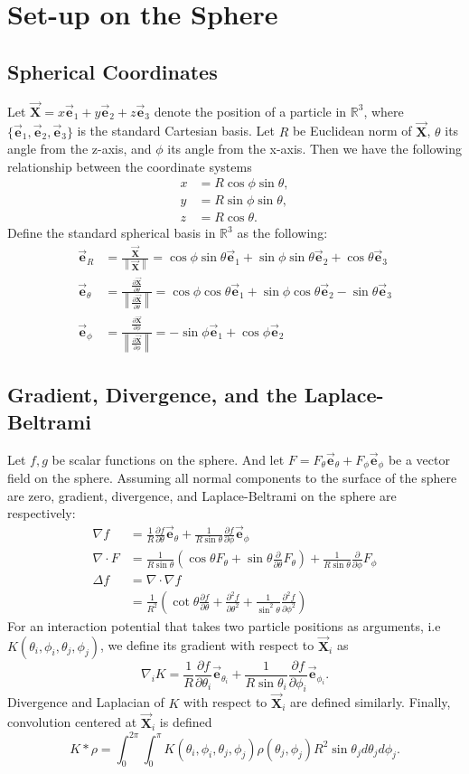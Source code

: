 \documentclass{article}
\newcommand{\p}{\partial}
\newcommand{\h}{\theta}
\newcommand{\hi}{\theta_i}
\newcommand{\hj}{\theta_j}
\newcommand{\ei}{\vec{\mathbf{e}}_1}
\newcommand{\ej}{\vec{\mathbf{e}}_2}
\newcommand{\ek}{\vec{\mathbf{e}}_3}
\newcommand{\er}{\vec{\mathbf{e}}_R}
\newcommand{\eh}{\vec{\mathbf{e}}_\theta}
\newcommand{\ep}{\vec{\mathbf{e}}_\phi}
\newcommand{\ehi}{\vec{\mathbf{e}}_{\theta_i}}
\newcommand{\epi}{\vec{\mathbf{e}}_{\phi_i}}
\newcommand{\X}{\vec{\mathbf{X}}}
\newcommand{\R}{\mathbb{R}}
\newcommand{\norm}[1]{\left\lVert#1\right\rVert}
\begin{document}
\section{Set-up on the Sphere}

\subsection{Spherical Coordinates}
Let $\X = x\ei + y\ej + z\ek$ denote the position of a particle in $\R^3$, where $\{\ei,\ej,\ek\}$ is the standard Cartesian basis. Let $R$ be Euclidean norm of $\X$, $\h$ its angle from the z-axis, and $\phi$ its angle from the x-axis. Then we have the following relationship between the coordinate systems
\begin{align*}
x &= R \cos{\phi} \sin{\h}, \\
y &= R \sin{\phi} \sin{\h}, \\
z &= R \cos{\h}.
\end{align*}
Define the standard spherical basis in $\R^3$ as the following:
\begin{align*}
\er &= \frac{\X}{\norm{\X}} = \cos{\phi} \sin{\h} \ei + \sin{\phi} \sin{\h} \ej + \cos{\h} \ek \\
\eh &= \frac{\frac{\p \X}{\p \h}}{\norm{\frac{\p \X}{\p \h}}} = \cos{\phi}\cos{\h} \ei + \sin{\phi}\cos{\h} \ej - \sin{\h}\ek \\
\ep &= \frac{\frac{\p \X}{\p \phi}}{\norm{\frac{\p \X}{\p \phi}} } = -\sin{\phi}\ei + \cos{\phi}\ej
\end{align*}
\subsection{Gradient, Divergence, and the Laplace-Beltrami}

Let $f,g$ be scalar functions on the sphere. And let $F = F_\h \eh + F_{\phi} \ep$ be a vector field on the sphere. Assuming all normal components to the surface of the sphere are zero, gradient, divergence, and Laplace-Beltrami on the sphere are respectively:
\begin{align*}
\nabla f &= \frac{1}{R} \frac{\p f}{\p \h} \eh + \frac{1}{R\sin{\h}} \frac{\p f}{\p \phi} \ep \\
\nabla \cdot F &=\frac{1}{R\sin{\h}} \left(\cos{\h} F_\h + \sin{\h}\frac{\p}{\p\h} F_\h  \right) + \frac{1}{R\sin{\h}} \frac{\p}{\p \phi}F_\phi \\
\Delta f &= \nabla \cdot \nabla f \\
&= \frac{1}{R^2} \left( \cot{\h} \frac{\p f}{\p \h} + \frac{\p^2 f}{\p \h^2} + \frac{1}{\sin^2{\h}} \frac{\p^2 f}{\p \phi^2} \right)
\end{align*}
For an interaction potential that takes two particle positions as arguments, i.e $K(\hi,\phi_i,\hj,\phi_j)$, we define its gradient with respect to $\X_i$ as
\[
\nabla_i K = \frac{1}{R} \frac{\p f}{\p \hi} \ehi + \frac{1}{R\sin{\hi}} \frac{\p f}{\p \phi_i} \epi.
\]
Divergence and Laplacian of $K$ with respect to $\X_i$ are defined similarly.
Finally, convolution centered at $\X_i$ is defined
\[
K * \rho = \int_{0}^{2\pi} \int_{0}^{\pi} K(\hi, \phi_i, \hj, \phi_j) \rho(\hj,\phi_j) R^2 \sin{\hj} d\hj d\phi_j.
\]
\end{document}

